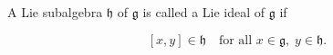 A Lie subalgebra $\mathfrak{h}$ of $\mathfrak{g}$ is called a Lie ideal of $\mathfrak{g}$ if

$$[x, y] \in \mathfrak{h} \quad \text{for all } x \in \mathfrak{g}, \; y \in \mathfrak{h}.$$
